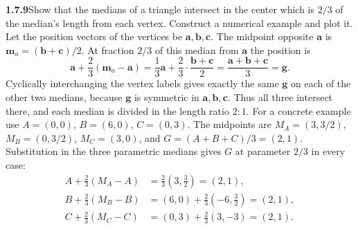 \par\bigskip
\noindent\textbf{1.7.9}\quad Show that the medians of a triangle intersect in
the center which is $2/3$ of the median's length from each vertex. Construct a
numerical example and plot it.
\solution
Let the position vectors of the vertices be $\mathbf a,\mathbf b,\mathbf c$.
The midpoint opposite $\mathbf a$ is $\mathbf m_a=(\mathbf b+\mathbf c)/2$.
At fraction $2/3$ of this median from $\mathbf a$ the position is
\[
 \mathbf a+\frac23(\mathbf m_a-\mathbf a)
 =\frac13\mathbf a+\frac23\cdot\frac{\mathbf b+\mathbf c}2
 =\frac{\mathbf a+\mathbf b+\mathbf c}{3}=\mathbf g.
\]
Cyclically interchanging the vertex labels gives exactly the same
$\mathbf g$ on each of the other two medians, because $\mathbf g$ is
symmetric in $\mathbf a,\mathbf b,\mathbf c$. Thus all three intersect
there, and each median is divided in the length ratio $2:1$.
For a concrete example use $A=(0,0)$, $B=(6,0)$, $C=(0,3)$.
The midpoints are $M_A=(3,3/2)$, $M_B=(0,3/2)$, $M_C=(3,0)$,
and $G=(A+B+C)/3=(2,1)$. Substitution in the three parametric medians
gives $G$ at parameter $2/3$ in every case:
\[
 \begin{aligned}
 A+\tfrac23(M_A-A)&=\tfrac23(3,\tfrac32)=(2,1),\\
 B+\tfrac23(M_B-B)&=(6,0)+\tfrac23(-6,\tfrac32)=(2,1),\\
 C+\tfrac23(M_C-C)&=(0,3)+\tfrac23(3,-3)=(2,1).
 \end{aligned}
\]
\begin{center}
\end{center}



